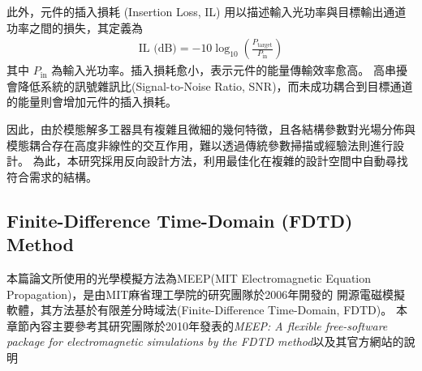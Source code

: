 此外，元件的插入損耗 (Insertion Loss, IL) 用以描述輸入光功率與目標輸出通道功率之間的損失，其定義為
\begin{align}
\text{IL (dB)} = -10 \log_{10} \left( \frac{P_{\text{target}}}{P_{\text{in}}} \right)
\label{eq:insertion loss}
\end{align}
其中 $P_{\mathrm{in}}$ 為輸入光功率。插入損耗愈小，表示元件的能量傳輸效率愈高。
高串擾會降低系統的訊號雜訊比(Signal-to-Noise Ratio, SNR)，而未成功耦合到目標通道的能量則會增加元件的插入損耗。

因此，由於模態解多工器具有複雜且微細的幾何特徵，且各結構參數對光場分佈與模態耦合存在高度非線性的交互作用，難以透過傳統參數掃描或經驗法則進行設計。
為此，本研究採用反向設計方法，利用最佳化在複雜的設計空間中自動尋找符合需求的結構。

\subsection{Finite-Difference Time-Domain (FDTD) Method}

本篇論文所使用的光學模擬方法為MEEP(MIT Electromagnetic Equation Propagation)，是由MIT麻省理工學院的研究團隊於2006年開發的
開源電磁模擬軟體，其方法基於有限差分時域法(Finite-Difference Time-Domain, FDTD)。
本章節內容主要參考其研究團隊於2010年發表的\textit{MEEP: A flexible free-software package for electromagnetic simulations by the FDTD method}\cite{oskooi2010_meep}以及其官方網站的說明\cite{meep_docs}

